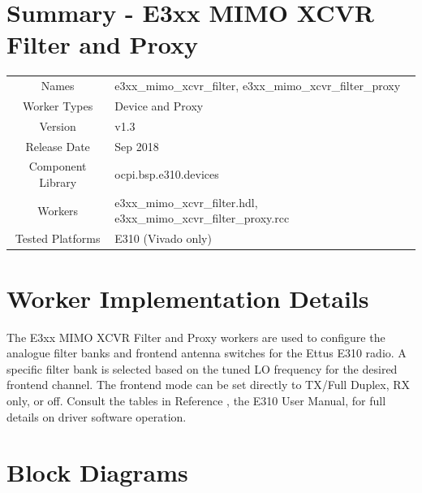 \documentclass{article}
\author{} %
\date{Version \docVersion} %
\title{\docTitle}
\def\docVersion{1.3}
\def\comp{e3xx\_mimo\_xcvr\_filter}
\def\proxy{e3xx\_mimo\_xcvr\_filter\_proxy}
\def\Comp{E3xx MIMO XCVR Filter and Proxy }
\begin{document}
\section*{Summary - \Comp}
\begin{tabular}{|c|M{13.5cm}|}
	\hline
	                  &                                      \\
	\hline
	Names              & \comp, \proxy                        \\
	\hline
	Worker Types       & Device and Proxy \\
	\hline
	Version           & v\docVersion \\
	\hline
	Release Date      & Sep 2018 \\
	\hline
	Component Library & ocpi.bsp.e310.devices   \\
	\hline
	Workers           & \comp.hdl, \proxy.rcc                \\
	\hline
	Tested Platforms  & E310 (Vivado only)                       \\
	\hline
\end{tabular}

\section*{Worker Implementation Details}
The \Comp workers are used to configure the analogue filter banks and frontend antenna switches for the Ettus E310 radio. A specific filter bank is selected based on the tuned LO frequency for the desired frontend channel. The frontend mode can be set directly to TX/Full Duplex, RX only, or off. Consult the tables in Reference \cite{usermanual}, the E310 User Manual, for full details on driver software operation.
\section*{Block Diagrams}
\end{document}
